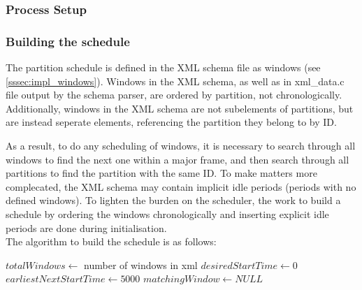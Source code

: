 \subsubsection{Process Setup}
\subsubsection{Building the schedule}
\label{sssec:build_schedule}
The partition schedule is defined in the XML schema file as windows (see 
\ref{sssec:impl_windows}). Windows in the XML schema, as well as in xml\_data.c
file output by the schema parser, are ordered by partition, not chronologically.
Additionally, windows in the XML schema are not subelements of partitions, but
are instead seperate elements, referencing the partition they belong to by ID.

As a result, to do any scheduling of windows, it is necessary to search through
all windows to find the next one within a major frame, and then search through
all partitions to find the partition with the same ID. To make matters more
complecated, the XML schema may contain implicit idle periods (periods with no
defined windows). To lighten the burden on the scheduler, the work to build a
schedule by ordering the windows chronologically and inserting explicit idle
periods are done during initialisation.\\

The algorithm to build the schedule is as follows:\\
\begin{algorithm}[H]
$totalWindows \leftarrow$ number of windows in xml\;
$desiredStartTime \leftarrow 0$\;
$earliestNextStartTime \leftarrow 5000$\;
$matchingWindow \leftarrow NULL$\;
\end{algorithm}

